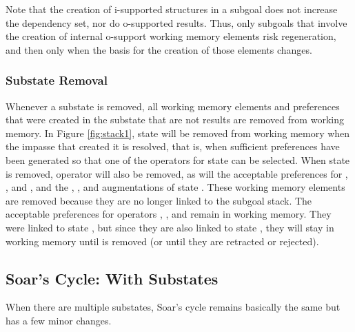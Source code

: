 Note that the creation of i-supported structures in a subgoal does not increase the dependency set, nor do o-supported results.  Thus, only subgoals that involve the creation of internal o-support working memory elements risk regeneration, and then only when the basis for the creation of those elements changes.

\subsubsection*{Substate Removal}

Whenever a substate is removed, all working memory elements and preferences that were created in the substate that are not results are removed from working memory. In Figure \ref{fig:stack1}, state  will be removed from working memory when the impasse that created it is resolved, that is, when sufficient preferences have been generated so that one of the operators for state  can be selected. When state  is removed, operator  will also be removed, as will the acceptable preferences for , , and , and the , , and  augmentations of state . These working memory elements are removed because they are no longer linked to the subgoal stack. The acceptable preferences for operators , , and  remain in working memory. They were linked to state , but since they are also linked to state , they will stay in working memory until  is removed (or until they are retracted or rejected).

\subsection{Soar's Cycle: With Substates}
\label{ARCH-decision-substates}

When there are multiple substates, Soar's cycle remains basically the same but has a few minor changes.



